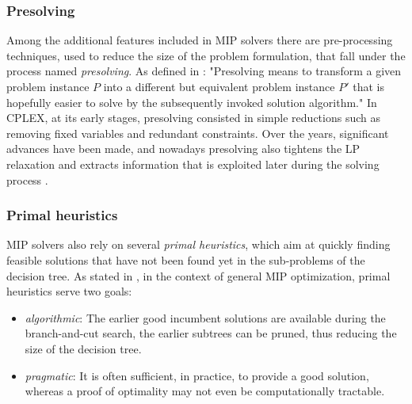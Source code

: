 \documentclass[a4paper,12pt,twoside]{scrbook}
\begin{document}
\subsubsection{Presolving}
Among the additional features included in MIP solvers there are pre-processing techniques, used to reduce the size of the problem formulation, that fall under the process named \textit{presolving}.
As defined in \cite{achterberg2013}:
	"Presolving means to transform a given problem instance $P$ into a
	different but equivalent problem instance $P'$ that is hopefully easier to solve by the subsequently invoked solution algorithm."
In CPLEX, at its early stages, presolving consisted in simple reductions such as removing fixed variables and redundant constraints. Over the years, significant advances have been made, and nowadays presolving also tightens the LP relaxation and extracts information that is exploited later during the solving process \cite{achterberg2013}. \par 

\subsubsection{Primal heuristics}
MIP solvers also rely on several \textit{primal heuristics}, which aim at quickly finding feasible solutions that have not been found yet in the sub-problems of the decision tree.
As stated in \cite{achterberg2013}, in the context of general MIP optimization, primal heuristics serve two goals:
\begin{itemize}
	\item \textit{algorithmic}: The earlier good incumbent solutions are available during the branch-and-cut search, the earlier subtrees can be pruned, thus reducing the size of the decision tree.
	\item \textit{pragmatic}: It is often sufficient, in practice, to provide a good solution, whereas a proof of optimality may not even be computationally tractable.
\end{itemize}
\end{document}
